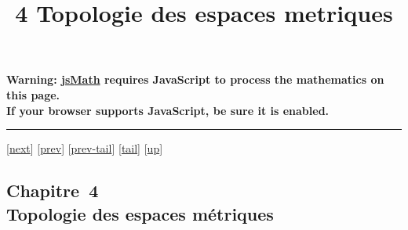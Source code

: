 \documentclass[]{article}
\title{4 Topologie des espaces metriques}
\author{}
\date{}
\begin{document}
\maketitle

\textbf{Warning: \href{http://www.math.union.edu/locate/jsMath}{jsMath}
requires JavaScript to process the mathematics on this page.\\ If your
browser supports JavaScript, be sure it is enabled.}

\begin{center}\rule{3in}{0.4pt}\end{center}

{[}\href{coursch6.html}{next}{]} {[}\href{coursch4.html}{prev}{]}
{[}\href{coursch4.html\#tailcoursch4.html}{prev-tail}{]}
{[}\hyperref[tailcoursch5.html]{tail}{]}
{[}\href{cours.html\#coursch5.html}{up}{]}

\subsection{Chapitre~4\\Topologie des espaces métriques}
\end{document}
